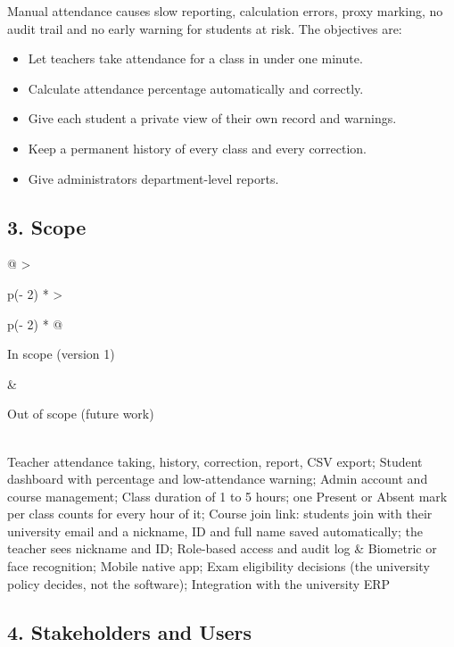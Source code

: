 \documentclass[
  11pt,
]{article}
\providecommand{\tightlist}{%
  \setlength{\itemsep}{0pt}\setlength{\parskip}{0pt}}
\begin{document}
Manual attendance causes slow reporting, calculation errors, proxy
marking, no audit trail and no early warning for students at risk. The
objectives are:

\begin{itemize}
\tightlist
\item
  Let teachers take attendance for a class in under one minute.
\item
  Calculate attendance percentage automatically and correctly.
\item
  Give each student a private view of their own record and warnings.
\item
  Keep a permanent history of every class and every correction.
\item
  Give administrators department-level reports.
\end{itemize}

\hypertarget{scope}{%
\subsection{3. Scope}\label{scope}}

\begin{longtable}[]{@{}
  >{\raggedright\arraybackslash}p{(\columnwidth - 2\tabcolsep) * }
  >{\raggedright\arraybackslash}p{(\columnwidth - 2\tabcolsep) * }@{}}
\toprule\noalign{}
\begin{minipage}[b]{\linewidth}\raggedright
In scope (version 1)
\end{minipage} & \begin{minipage}[b]{\linewidth}\raggedright
Out of scope (future work)
\end{minipage} \\
\midrule\noalign{}
\endhead
\bottomrule\noalign{}
\endlastfoot
Teacher attendance taking, history, correction, report, CSV export;
Student dashboard with percentage and low-attendance warning; Admin
account and course management; Class duration of 1 to 5 hours; one
Present or Absent mark per class counts for every hour of it; Course
join link: students join with their university email and a nickname, ID
and full name saved automatically; the teacher sees nickname and ID;
Role-based access and audit log & Biometric or face recognition; Mobile
native app; Exam eligibility decisions (the university policy decides,
not the software); Integration with the university ERP \\
\end{longtable}

\hypertarget{stakeholders-and-users}{%
\subsection{4. Stakeholders and Users}\label{stakeholders-and-users}}
\end{document}
